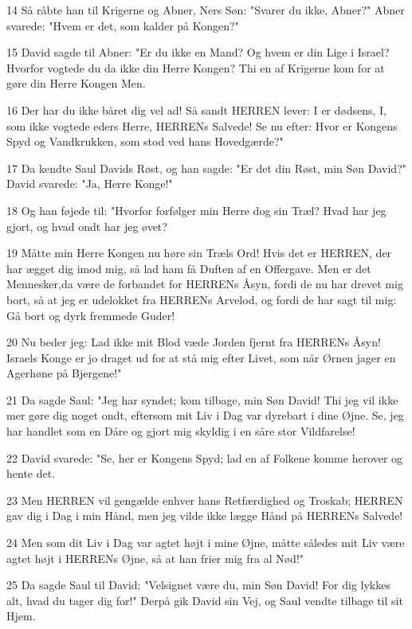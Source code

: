 \par 14 Så råbte han til Krigerne og Abner, Ners Søn: "Svarer du ikke, Abner?" Abner svarede: "Hvem er det, som kalder på Kongen?"
\par 15 David sagde til Abner: "Er du ikke en Mand? Og hvem er din Lige i Israel? Hvorfor vogtede du da ikke din Herre Kongen? Thi en af Krigerne kom for at gøre din Herre Kongen Men.
\par 16 Der har du ikke båret dig vel ad! Så sandt HERREN lever: I er dødsens, I, som ikke vogtede eders Herre, HERRENs Salvede! Se nu efter: Hvor er Kongens Spyd og Vandkrukken, som stod ved hans Hovedgærde?"
\par 17 Da kendte Saul Davids Røst, og han sagde: "Er det din Røst, min Søn David?" David svarede: "Ja, Herre Konge!"
\par 18 Og han føjede til: "Hvorfor forfølger min Herre dog sin Træl? Hvad har jeg gjort, og hvad ondt har jeg øvet?
\par 19 Måtte min Herre Kongen nu høre sin Træls Ord! Hvis det er HERREN, der har ægget dig imod mig, så lad ham få Duften af en Offergave. Men er det Mennesker,da være de forbandet for HERRENs Åsyn, fordi de nu har drevet mig bort, så at jeg er udelokket fra HERRENs Arvelod, og fordi de har sagt til mig: Gå bort og dyrk fremmede Guder!
\par 20 Nu beder jeg: Lad ikke mit Blod væde Jorden fjernt fra HERRENs Åsyn! Israels Konge er jo draget ud for at stå mig efter Livet, som når Ørnen jager en Agerhøne på Bjergene!"
\par 21 Da sagde Saul: "Jeg har syndet; kom tilbage, min Søn David! Thi jeg vil ikke mer gøre dig noget ondt, eftersom mit Liv i Dag var dyrebart i dine Øjne. Se, jeg har handlet som en Dåre og gjort mig skyldig i en såre stor Vildfarelse!
\par 22 David svarede: "Se, her er Kongens Spyd; lad en af Folkene komme herover og hente det.
\par 23 Men HERREN vil gengælde enhver hans Retfærdighed og Troskab; HERREN gav dig i Dag i min Hånd, men jeg vilde ikke lægge Hånd på HERRENs Salvede!
\par 24 Men som dit Liv i Dag var agtet højt i mine Øjne, måtte således mit Liv være agtet højt i HERRENs Øjne, så at han frier mig fra al Nød!"
\par 25 Da sagde Saul til David: "Velsignet være du, min Søn David! For dig lykkes alt, hvad du tager dig for!" Derpå gik David sin Vej, og Saul vendte tilbage til sit Hjem.

